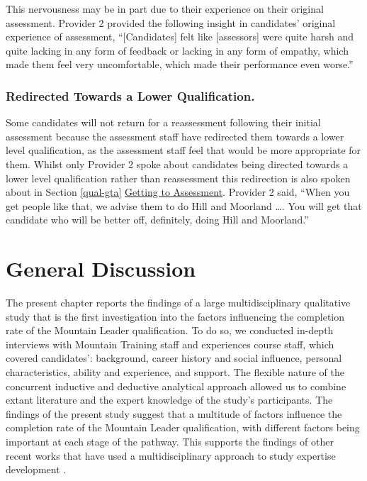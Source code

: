 \documentclass[
  12pt,
  a4paper,
]{book}
\begin{document}
This nervousness may be in part due to their experience on their original assessment. Provider 2 provided the following insight in candidates' original experience of assessment, ``{[}Candidates{]} felt like {[}assessors{]} were quite harsh and quite lacking in any form of feedback or lacking in any form of empathy, which made them feel very uncomfortable, which made their performance even worse.''

\hypertarget{redirected-towards-a-lower-qualification.}{%
\subsubsection{Redirected Towards a Lower Qualification.}\label{redirected-towards-a-lower-qualification.}}

Some candidates will not return for a reassessment following their initial assessment because the assessment staff have redirected them towards a lower level qualification, as the assessment staff feel that would be more appropriate for them. Whilst only Provider 2 spoke about candidates being directed towards a lower level qualification rather than reassessment this redirection is also spoken about in Section \ref{qual-gta} \protect\hyperlink{qual-gta}{Getting to Assessment}. Provider 2 said, ``When you get people like that, we advise them to do Hill and Moorland \ldots. You will get that candidate who will be better off, definitely, doing Hill and Moorland.''

\hypertarget{qual-general-discussion}{%
\section{General Discussion}\label{qual-general-discussion}}

The present chapter reports the findings of a large multidisciplinary qualitative study that is the first investigation into the factors influencing the completion rate of the Mountain Leader qualification. To do so, we conducted in-depth interviews with Mountain Training staff and experiences course staff, which covered candidates': background, career history and social influence, personal characteristics, ability and experience, and support. The flexible nature of the concurrent inductive and deductive analytical approach allowed us to combine extant literature and the expert knowledge of the study's participants. The findings of the present study suggest that a multitude of factors influence the completion rate of the Mountain Leader qualification, with different factors being important at each stage of the pathway. This supports the findings of other recent works that have used a multidisciplinary approach to study expertise development \citep[e.g.,][]{Hardy2017, Gullich2019, Jones2020}.
\end{document}
